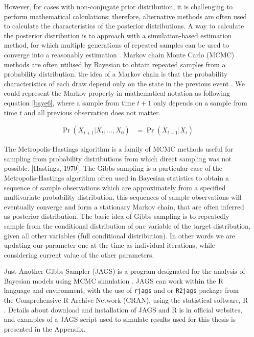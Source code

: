 However, for cases with non-conjugate prior distribution, it is challenging to perform mathematical calculations; therefore, alternative methods are often used to calculate the characteristics of the posterior distributions. A way to calculate the posterior distribution is to approach with a simulation-based estimation method, for which multiple generations of repeated samples can be used to converge into a reasonably estimation \citep{congdon2007bayesian}. Markov chain Monte Carlo (MCMC) methods are often utilised by Bayesian to obtain repeated samples from a probability distribution, the idea of a Markov chain is that the probability characteristics of each draw depend only on the state in the previous event \citep{Fewster14}. We could represent the Markov property in mathematical notation as following equation \ref{baye6}, where a sample from time $t+1$ only depends on a sample from time $t$ and all previous observation does not matter.

\begin{equation} \label{baye6}
\begin{aligned}
\Pr(X_{t+1}|X_t,...,X_0)
&= \Pr(X_{t+1}|X_t)
\end{aligned}
\end{equation}

The Metropolis-Hastings algorithm is a family of MCMC methods useful for sampling from probability distributions from which direct sampling was not possible. [Hastings, 1970]. The Gibbs sampling is a particular case of the Metropolis-Hastings algorithm often used in Bayesian statistics to obtain a sequence of sample observations which are approximately from a specified multivariate probability distribution, this sequences of sample observations will eventually converge and form a stationary Markov chain, that are often inferred as posterior distribution. The basic idea of Gibbs sampling is to repeatedly sample from the conditional distribution of one variable of the target distribution, given all other variables (full conditional distribution). In other words we are updating our parameter one at the time as individual iterations, while considering current value of the other parameters. 

Just Another Gibbs Sampler (JAGS) is a program designated for the analysis of Bayesian models using MCMC simulation \citep{plummer2003jags}. JAGS can work within the R language and environment, with the use of \texttt{rjags} \citep{rjags} and or \texttt{R2jags} \citep{R2jags} package from the Comprehensive R Archive Network (CRAN), using the statistical software, R \citep{R}. Details about download and installation of JAGS and R is in official websites, and examples of a JAGS script used to simulate results used for this thesis is presented in the Appendix.

